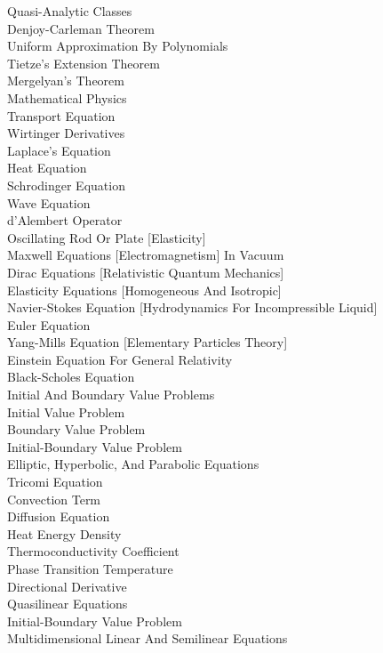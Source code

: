 Quasi-Analytic Classes \\
Denjoy-Carleman Theorem \\
Uniform Approximation By Polynomials \\
Tietze's Extension Theorem \\
Mergelyan's Theorem \\
Mathematical Physics \\
Transport Equation \\
Wirtinger Derivatives \\
Laplace's Equation \\
Heat Equation \\
Schrodinger Equation \\
Wave Equation \\
d'Alembert Operator \\
Oscillating Rod Or Plate [Elasticity] \\
Maxwell Equations [Electromagnetism] In Vacuum \\
Dirac Equations [Relativistic Quantum Mechanics] \\
Elasticity Equations [Homogeneous And Isotropic] \\
Navier-Stokes Equation [Hydrodynamics For Incompressible Liquid] \\
Euler Equation \\
Yang-Mills Equation [Elementary Particles Theory] \\
Einstein Equation For General Relativity \\
Black-Scholes Equation \\
Initial And Boundary Value Problems \\
Initial Value Problem \\
Boundary Value Problem \\
Initial-Boundary Value Problem \\
Elliptic, Hyperbolic, And Parabolic Equations \\
Tricomi Equation \\
Convection Term \\
Diffusion Equation \\
Heat Energy Density \\
Thermoconductivity Coefficient \\
Phase Transition Temperature \\
Directional Derivative \\
Quasilinear Equations \\
Initial-Boundary Value Problem \\
Multidimensional Linear And Semilinear Equations \\
